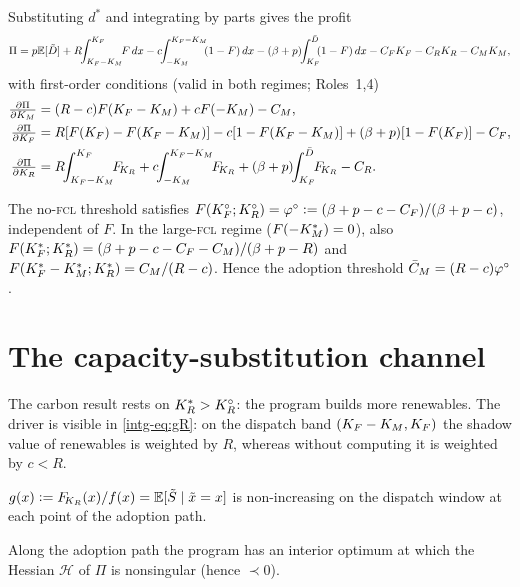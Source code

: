 Substituting $d^{*}$ and integrating by parts gives the profit
\begin{equation}\label{intg-eq:profit}
  \Pi=p\E[\tilde D]+R\!\!\int_{\KF-\KM}^{\KF}\!\!F\,dx
  -c\!\!\int_{-\KM}^{\KF-\KM}\!\!(1-F)\,dx
  -(\bp)\!\!\int_{\KF}^{\Dbar}\!\!(1-F)\,dx-\CF\KF-\CR\KR-\CM\KM,
\end{equation}
with first-order conditions (valid in both regimes; Roles~1,4)
\begin{align}
  \tfrac{\partial\Pi}{\partial\KM}&=(R-c)F(\KF-\KM)+cF(-\KM)-\CM,\label{intg-eq:gM}\\
  \tfrac{\partial\Pi}{\partial\KF}&=R[F(\KF)-F(\KF-\KM)]-c[1-F(\KF-\KM)]+(\bp)[1-F(\KF)]-\CF,\label{intg-eq:gF}\\
  \tfrac{\partial\Pi}{\partial\KR}&=R\!\!\int_{\KF-\KM}^{\KF}\!\!\FKR+c\!\!\int_{-\KM}^{\KF-\KM}\!\!\FKR+(\bp)\!\!\int_{\KF}^{\Dbar}\!\!\FKR-\CR.\label{intg-eq:gR}
\end{align}

\begin{lemma}\label{intg-lem:cutoffs}
The no-\textsc{fcl} threshold satisfies $F(K_F^{\circ};K_R^{\circ})=\varphi^{\circ}\vcentcolon=(\beta+p-c-C_F)/(\beta+p-c)$,
independent of $F$. In the large-\textsc{fcl} regime ($F(-K_M^{*})=0$), also
$F(K_F^{*};K_R^{*})=(\beta+p-c-C_F-C_M)/(\beta+p-R)$ and $F(K_F^{*}-K_M^{*};K_R^{*})=C_M/(R-c)$. Hence
the adoption threshold $\bar C_M=(R-c)\varphi^{\circ}$.
\end{lemma}

\section{The capacity-substitution channel}\label{intg-sec:channel}

The carbon result rests on $K_R^{*}>K_R^{\circ}$: the program builds more renewables.
The driver is visible in \eqref{intg-eq:gR}: on the dispatch band $(K_F-K_M,K_F)$ the
shadow value of renewables is weighted by $R$, whereas without computing it is
weighted by $c<R$.

\begin{condition}\label{intg-cond:cs}
$g(x)\vcentcolon=F_{\!K_R}(x)/f(x)=\mathbb{E}[\tilde S\mid\tilde x=x]$ is non-increasing on the
dispatch window at each point of the adoption path.
\end{condition}

\begin{condition}[Regularity]\label{intg-cond:reg}
Along the adoption path the program has an interior optimum at which the Hessian
$\mathcal H$ of $\Pi$ is nonsingular (hence $\prec0$).
\end{condition}

